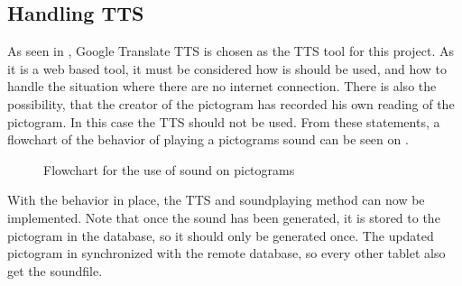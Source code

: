 \subsection{Handling TTS}%
As seen in , Google Translate TTS is chosen as the TTS tool for this project. As it is a web based tool, it must be considered how is should be used, and how to handle the situation where there are no internet connection. There is also the possibility, that the creator of the pictogram has recorded his own reading of the pictogram. In this case the TTS should not be used. From these statements, a flowchart of the behavior of playing a pictograms sound can be seen on .

\begin{savenotes}
\begin{figure}[H]
\caption{Flowchart for the use of sound on pictograms}
\label{fig:soundflow}
\end{figure}
\end{savenotes}

With the behavior in place, the TTS and soundplaying method can now be implemented. Note that once the sound has been generated, it is stored to the pictogram in the database, so it should only be generated once. The updated pictogram in synchronized with the remote database, so every other tablet also get the soundfile.